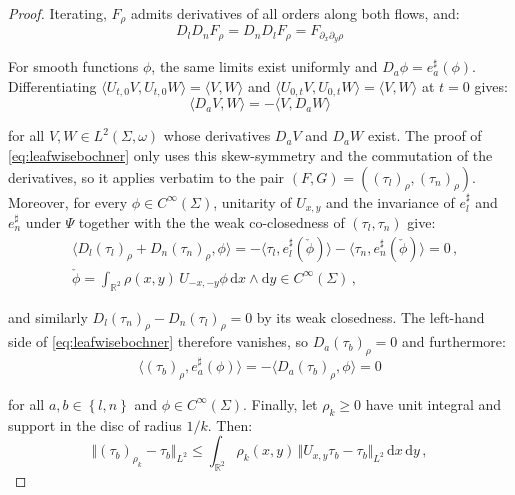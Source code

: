 \documentclass[10pt,reqno,a4paper]{amsart}
\theoremstyle{plain}
\theoremstyle{definition}
\theoremstyle{remark}
\theoremstyle{remark}
\def\dd{\mathrm{d}}
\renewcommand{\(}{ (}
\renewcommand{\)}{ )}
\begin{document}
\begin{proof}
\noindent
Iterating, $F_{\rho}$ admits derivatives of all orders along both flows, and:
\begin{equation*}
D_lD_nF_{\rho} = D_nD_lF_{\rho} = F_{\partial_x\partial_y\rho}    
\end{equation*}

\noindent
For smooth functions $\phi$, the same limits exist uniformly and $D_a\phi = e_a^{\sharp}(\phi)$. Differentiating $\langle U_{t,0}V,U_{t,0}W\rangle = \langle V,W\rangle$ and $\langle U_{0,t}V,U_{0,t}W\rangle = \langle V,W\rangle$ at $t=0$ gives:
\begin{equation*}
\langle D_aV,W\rangle = -\langle V,D_aW\rangle    
\end{equation*}

\noindent
for all $V,W\in L^2(\Sigma,\omega)$ whose derivatives $D_aV$ and $D_aW$ exist. The proof of \eqref{eq:leafwisebochner} only uses this skew-symmetry and the commutation of the derivatives, so it applies verbatim to the pair $(F,G) = ((\tau_l)_{\rho},(\tau_n)_{\rho})$. Moreover, for every $\phi\in C^{\infty}(\Sigma)$, unitarity of $U_{x,y}$ and the invariance of $e_l^{\sharp}$ and $e_n^{\sharp}$ under $\Psi$ together with the the weak co-closedness of $(\tau_l,\tau_n)$ give:
\begin{eqnarray*}
& \langle D_l(\tau_l)_{\rho} + D_n(\tau_n)_{\rho} , \phi\rangle = -\langle\tau_l , e_l^{\sharp}(\check{\phi})\rangle - \langle\tau_n , e_n^{\sharp}(\check{\phi})\rangle = 0\, , \\
& \check{\phi} = \int_{\mathbb{R}^2}\rho(x,y)\, U_{-x,-y}\phi\,\dd x\wedge \dd y\in C^{\infty}(\Sigma)\, ,
\end{eqnarray*}

\noindent
and similarly $D_l(\tau_n)_{\rho} - D_n(\tau_l)_{\rho} = 0$ by its weak closedness. The left-hand side of \eqref{eq:leafwisebochner} therefore vanishes, so $D_a(\tau_b)_{\rho} = 0$ and furthermore:
\begin{equation*}
\langle(\tau_b)_{\rho} , e_a^{\sharp}(\phi)\rangle = -\langle D_a(\tau_b)_{\rho},\phi\rangle = 0    
\end{equation*}

\noindent
for all $a,b\in\left\{ l,n\right\}$ and $\phi\in C^{\infty}(\Sigma)$. Finally, let $\rho_k\geq 0$ have unit integral and support in the disc of radius $1/k$. Then:
\begin{equation*}
\Vert(\tau_b)_{\rho_k} - \tau_b\Vert_{L^2}\leq\int_{\mathbb{R}^2}\rho_k(x,y)\,\Vert U_{x,y}\tau_b - \tau_b\Vert_{L^2}\,\dd x\,\dd y\, ,
\end{equation*}


\end{proof}
\end{document}
